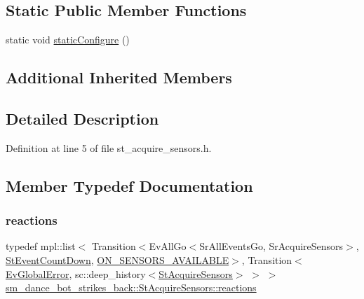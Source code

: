 \subsection*{Static Public Member Functions}
\begin{DoxyCompactItemize}
\item 
static void \hyperlink{structsm__dance__bot__strikes__back_1_1StAcquireSensors_a83de29e9c8ce05f82c487b91255f9fe1}{static\+Configure} ()
\end{DoxyCompactItemize}
\subsection*{Additional Inherited Members}


\subsection{Detailed Description}


Definition at line 5 of file st\+\_\+acquire\+\_\+sensors.\+h.



\subsection{Member Typedef Documentation}
\mbox{\label{structsm__dance__bot__strikes__back_1_1StAcquireSensors_ad65bcd9c9ba0118eff0670ec6eed65fd}} 
\subsubsection{\texorpdfstring{reactions}{reactions}}
{\footnotesize\ttfamily typedef mpl\+::list$<$ Transition$<$Ev\+All\+Go$<$Sr\+All\+Events\+Go, Sr\+Acquire\+Sensors$>$, \hyperlink{structsm__dance__bot__strikes__back_1_1StEventCountDown}{St\+Event\+Count\+Down}, \hyperlink{structsm__dance__bot__strikes__back_1_1StAcquireSensors_1_1ON__SENSORS__AVAILABLE}{O\+N\+\_\+\+S\+E\+N\+S\+O\+R\+S\+\_\+\+A\+V\+A\+I\+L\+A\+B\+LE}$>$, Transition$<$\hyperlink{structsm__dance__bot__strikes__back_1_1EvGlobalError}{Ev\+Global\+Error}, sc\+::deep\+\_\+history$<$\hyperlink{structsm__dance__bot__strikes__back_1_1StAcquireSensors}{St\+Acquire\+Sensors}$>$ $>$ $>$ \hyperlink{structsm__dance__bot__strikes__back_1_1StAcquireSensors_ad65bcd9c9ba0118eff0670ec6eed65fd}{sm\+\_\+dance\+\_\+bot\+\_\+strikes\+\_\+back\+::\+St\+Acquire\+Sensors\+::reactions}}



